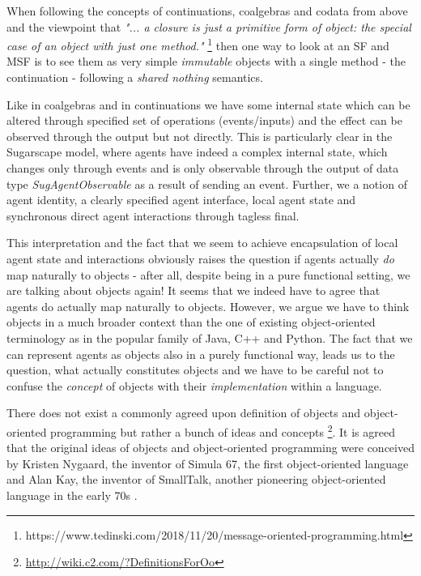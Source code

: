 \medskip

When following the concepts of continuations, coalgebras and codata from above and the viewpoint that \textit{"... a closure is just a primitive form of object: the special case of an object with just one method."} \footnote{https://www.tedinski.com/2018/11/20/message-oriented-programming.html} then one way to look at an SF and MSF is to see them as very simple \textit{immutable} objects with a single method - the continuation - following a \textit{shared nothing} semantics. 

Like in coalgebras and in continuations we have some internal state which can be altered through specified set of operations (events/inputs) and the effect can be observed through the output but not directly. This is particularly clear in the Sugarscape model, where agents have indeed a complex internal state, which changes only through events and is only observable through the output of data type \textit{SugAgentObservable} as a result of sending an event. Further, we a notion of agent identity, a clearly specified agent interface, local agent state and synchronous direct agent interactions through tagless final.

This interpretation and the fact that we seem to achieve encapsulation of local agent state and interactions obviously raises the question if agents actually \textit{do} map naturally to objects - after all, despite being in a pure functional setting, we are talking about objects again! It seems that we indeed have to agree that agents do actually map naturally to objects. However, we argue we have to think objects in a much broader context than the one of existing object-oriented terminology as in the popular family of Java, C++ and Python. The fact that we can represent agents as objects also in a purely functional way, leads us to the question, what actually constitutes objects and we have to be careful not to confuse the \textit{concept} of objects with their \textit{implementation} within a language.

\medskip

There does not exist a commonly agreed upon definition of objects and object-oriented programming but rather a bunch of ideas and concepts \footnote{\url{http://wiki.c2.com/?DefinitionsForOo}}. It is agreed that the original ideas of objects and object-oriented programming were conceived by Kristen Nygaard, the inventor of Simula 67, the first object-oriented language \cite{dahl_birth_2002} and Alan Kay, the inventor of SmallTalk, another pioneering object-oriented language in the early 70s \cite{kay_early_1993}. %

